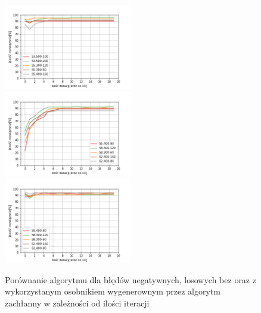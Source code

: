 \documentclass{article}
\begin{document}
\begin{figure}[H]
\includegraphics[width=0.5\textwidth]{neg-los-greedy3.png}
\includegraphics[width=0.5\textwidth]{neg-los4.png}
\includegraphics[width=0.5\textwidth]{neg-los-greedy4.png}
\caption{Porównanie algorytmu dla błędów negatywnych, losowych bez oraz z wykorzystanym osobnikiem wygenerownym przez algorytm zachłanny w zależności od ilości iteracji}
\end{figure}
\end{document}
